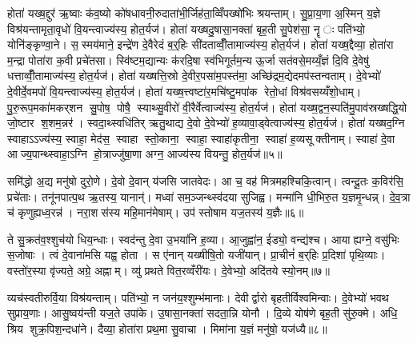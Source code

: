 होता॑ यख्ष॒द्दुर॑ ऋ॒ष्वाः क॑व॒ष्यो को॑षधावनी॒रुदाता॑भी॒र्जिह॑ता॒व्विँपख्षो॑भिः श्रयन्ताम्। सु॒प्रा॒य॒णा अ॒स्मिन् य॒ज्ञे विश्र॑यन्तामृता॒वृधो॑ वि॒यन्त्वाज्य॑स्य॒ होत॒र्यज॑। होता॑ यख्षदु॒षासा॒नक्ता॑ बृह॒ती सु॒पेश॑सा॒ नॄः पति॑भ्यो॒ योनि॑ङ्कृण्वा॒ने। स॒स्मय॑माने॒ इन्द्रे॑ण दे॒वैरेदं ब॒र्॒हिः सी॑दताव्वीँ॒तामाज्य॑स्य॒ होत॒र्यज॑। होता॑ यख्ष॒द्दैव्या॒ होता॑रा म॒न्द्रा पोता॑रा क॒वी प्रचे॑तसा। स्वि॑ष्टम॒द्यान्यः क॑रदि॒षा स्व॑भिगूर्तम॒न्य ऊ॒र्जा सत॑वसे॒मय्यँ॒ज्ञं दि॒वि दे॒वेषु॑ धत्ताव्वीँ॒तामाज्य॑स्य॒ होत॒र्यज॑। होता॑ यख्षत्ति॒स्रो दे॒वीर॒पसा॑म॒पस्त॑मा॒ अच्छि॑द्रम॒द्येदमप॑स्तन्वताम्। दे॒वेभ्यो॑ दे॒वीर्दे॒वमपो॑ वि॒यन्त्वाज्य॑स्य॒ होत॒र्यज॑। होता॑ यख्ष॒त्त्वष्टा॑र॒मचि॑ष्टु॒मपा॑क रेतो॒धां विश्र॑वसय्यँशो॒धाम्। पु॒रु॒रूप॒मका॑मकर्‌शन सु॒पोष॒ पोषै॒ स्याथ्सु॒वीरो॑ वी॒रैर्वेत्वाज्य॑स्य॒ होत॒र्यज॑। होता॑ यख्ष॒द्वन॒स्पति॑मु॒पाव॑स्रख्षद्धि॒यो जो॒ष्टार श॒शम॒न्नर॑। स्वदा॒थ्स्वधि॑तिर् ऋतु॒थाद्य दे॒वो दे॒वेभ्यो॑ ह॒व्यावा॒ड्वेत्वाज्य॑स्य॒ होत॒र्यज॑। होता॑ यख्षद॒ग्नि स्वाहाऽऽज्य॑स्य॒ स्वाहा॒ मेद॑स॒ स्वाहा स्तो॒काना॒ स्वाहा॒ स्वाहा॑कृतीना॒ स्वाहा॑ ह॒व्यसूक्तीनाम्। स्वाहा॑ दे॒वा आज्य॒पान्थ्स्वाहा॒ऽग्नि हो॒त्राज्जु॑षा॒णा अग्न॒ आज्य॑स्य वियन्तु॒ होत॒र्यज॑॥५॥\anuvakamend[प्रि॒यमिन्द्र॑स्यास्तु॒ वेत्वाज्य॑स्य॒ होत॒र्यज॑ सु॒वीरो॑ वी॒रैर्वेत्वाज्य॑स्य॒ होत॒र्यज॑ च॒त्वारि॑ च (अ॒ग्निन्तनू॒नपा॑त॒न्नरा॒शस॑म॒ग्निमि॒ड ई॑डि॒तो ब॒र्‌हिर्दुर॑ उ॒षासा॒नक्ता॒ दैव्या॑ ति॒स्रस्त्वष्टा॑रं॒ वन॒स्पति॑म॒ग्निम्। पञ्च॒ वेत्वेको॑ वि॒यन्तु॒ द्विर्वी॒तामेको॑ वि॒यन्तु॒ द्विर्वेत्वेको॑ वियन्तु॒ होत॒र्यज॑ ॥ )]

समि॑द्धो अ॒द्य मनु॑षो दुरो॒णे। दे॒वो दे॒वान् य॑जसि जातवेदः। आ च॒ वह॑ मित्रमहश्चिकि॒त्वान्। त्वन्दू॒तः क॒विर॑सि॒ प्रचे॑ताः। तनू॑नपात्प॒थ ऋ॒तस्य॒ यानान्॑। मध्वा॑ सम॒ञ्जन्थ्स्व॑दया सुजिह्व। मन्मा॑नि धी॒भिरु॒त य॒ज्ञमृ॒न्धन्न्। दे॒व॒त्रा च॑ कृणुह्यध्व॒रन्न॑। नरा॒शस॑स्य महि॒मान॑मेषाम्। उप॑ स्तोषाम यज॒तस्य॑ य॒ज्ञैः॥६॥

ते सु॒क्रत॑व॒श्शुच॑यो धिय॒न्धाः। स्वद॑न्तु दे॒वा उ॒भया॑नि ह॒व्या। आ॒जुह्वा॑न॒ ईड्यो॒ वन्द्य॑श्च। आयाह्यग्ने॒ वसु॑भिः स॒जोषाः। त्वं दे॒वाना॑मसि यह्व॒ होता। स ए॑नान् यख्षीषि॒तो यजी॑यान्। प्रा॒चीनं॑ ब॒र्‌हिः प्र॒दिशा॑ पृथि॒व्याः। वस्तो॑र॒स्या वृ॑ज्यते॒ अग्रे॒ अह्नाम्। व्यु॑ प्रथते वित॒रव्वँरी॑यः। दे॒वेभ्यो॒ अदि॑तये स्यो॒नम्॥७॥

व्यच॑स्वतीरुर्वि॒या विश्र॑यन्ताम्। पति॑भ्यो॒ न जन॑य॒श्शुम्भ॑मानाः। देवीर्द्वारो बृहतीर्विश्वमिन्वाः। दे॒वेभ्यो॑ भवथ सुप्राय॒णाः। आसु॒ष्वय॑न्ती यज॒ते उपा॑के। उ॒षासा॒नक्ता॑ सदता॒न्नि योनौ। दि॒व्ये योष॑णे बृह॒ती सु॑रु॒क्मे। अधि॒ श्रिय शुक्र॒पिश॒न्दधा॑ने। दैव्या॒ होता॑रा प्रथ॒मा सु॒वाचा। मिमा॑ना य॒ज्ञं मनु॑षो॒ यज॑ध्यै॥८॥

